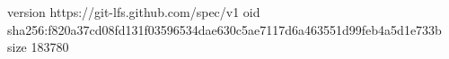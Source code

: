 version https://git-lfs.github.com/spec/v1
oid sha256:f820a37cd08fd131f03596534dae630c5ae7117d6a463551d99feb4a5d1e733b
size 183780
